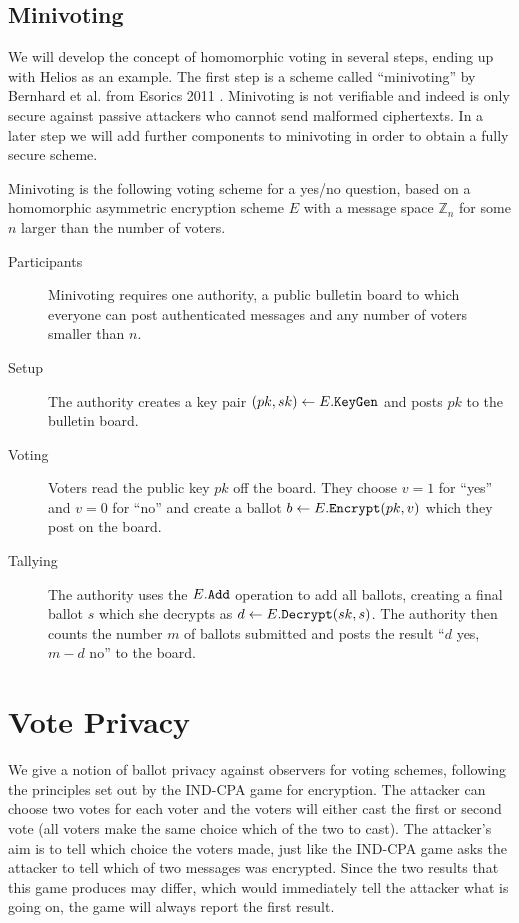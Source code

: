 \documentclass[envcountsame]{llncs}
\newcommand{\alg}[1]{\textup{\texttt{#1}}}
\begin{document}
\subsection{Minivoting}

We will develop the concept of homomorphic voting in several steps, ending up
with Helios as an example. The first step is a scheme called ``minivoting'' by
Bernhard et al. from Esorics 2011 \cite{BCPSW11}. Minivoting is not verifiable
and indeed is only secure against passive attackers who cannot send malformed
ciphertexts. In a later step we will add further components to minivoting in
order to obtain a fully secure scheme.

\begin{definition}
Minivoting is the following voting scheme for a yes/no question, based on a
homomorphic asymmetric encryption scheme $E$ with a message space $\mathbb Z_n$
for some $n$ larger than the number of voters.
\begin{description}
\item[Participants] Minivoting requires one authority, a public bulletin board
to which everyone can post authenticated messages and any number of voters
smaller than $n$.
\item[Setup]
The authority creates a key pair $(pk, sk) \gets E.\alg{KeyGen}$ and posts $pk$
to the bulletin board.
\item[Voting] Voters read the public key $pk$ off the board. They choose $v = 1$
for ``yes'' and $v = 0$ for ``no'' and create a ballot $b \gets
E.\alg{Encrypt}(pk, v)$ which they post on the board.
\item[Tallying] The authority uses the $E.\alg{Add}$ operation to add all
ballots, creating a final ballot $s$ which she decrypts as $d \gets E.\alg{Decrypt}
(sk, s)$. The authority then counts the number $m$ of ballots submitted and
posts the result ``$d$ yes, $m-d$ no'' to the board.
\end{description}
\end{definition}

\section{Vote Privacy}

We give a notion of ballot privacy against observers for voting schemes,
following the principles set out by the IND-CPA game for encryption. The
attacker can choose two votes for each voter and the voters will either cast the
first or second vote (all voters make the same choice which of the two to cast).
The attacker's aim is to tell which choice the voters made, just like the
IND-CPA game asks the attacker to tell which of two messages was encrypted.
Since the two results that this game produces may differ, which would
immediately tell the attacker what is going on, the game will always report the
first result.
\end{document}
